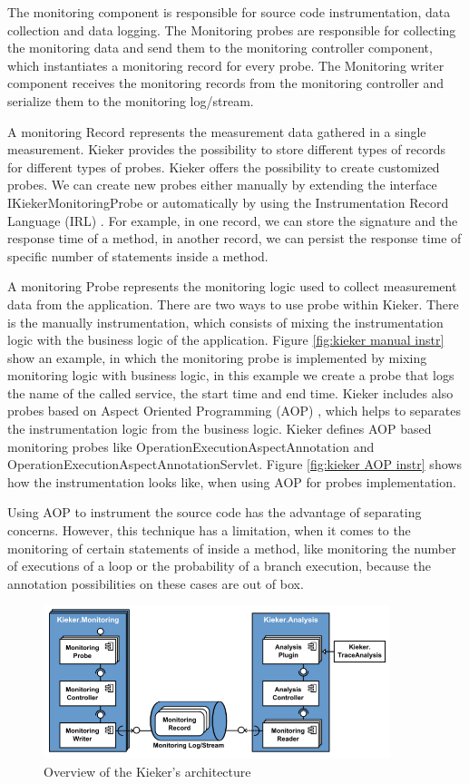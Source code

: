 The monitoring component is responsible for source code instrumentation, data collection and data logging. The Monitoring probes are responsible for collecting the monitoring data and send them to the monitoring controller component, which instantiates a monitoring record for every probe. The Monitoring writer component receives the monitoring records from the monitoring controller and serialize them to the monitoring log/stream. 

A monitoring Record represents the measurement data gathered in a single measurement. Kieker provides the possibility to store different types of records for different types of probes. Kieker offers the possibility to create customized probes. We can create new probes either manually by extending the interface IKiekerMonitoringProbe or automatically by using the Instrumentation Record Language (IRL) \cite{jung2013instrumentation}. For example, in one record, we can store the signature and the response time of a method, in another record, we can persist the response time of specific number of statements inside a method.

A monitoring Probe represents the monitoring logic used to collect measurement data from the application. There are two ways to use probe within Kieker.  There is the manually instrumentation, which consists of mixing the instrumentation logic with the business logic of the application. Figure \ref{fig:kieker manual instr} show an example, in which the monitoring probe is implemented by mixing monitoring logic with business logic, in this example we create a probe that logs the name of the called service, the start time and end time. Kieker includes also probes based on Aspect Oriented Programming (AOP) \cite{kiczales1997j}, which helps to separates the instrumentation logic from the business logic. Kieker defines AOP based monitoring probes like OperationExecutionAspectAnnotation and OperationExecutionAspectAnnotationServlet. Figure \ref{fig:kieker AOP instr} shows how the instrumentation looks like, when using AOP for probes implementation.

Using AOP to instrument the source code has the advantage of separating concerns. However, this technique has a limitation, when it comes to the monitoring of certain statements of inside a method, like monitoring the number of executions of a loop or the probability of a branch execution, because the annotation possibilities on these cases are out of box. 


\begin{figure}[h]
\centering
\includegraphics[width=0.9\textwidth]{figures/kieker}
\caption{Overview of the Kieker's architecture \cite{van2009continuous}}
\label{fig:kieker}
\end{figure}

